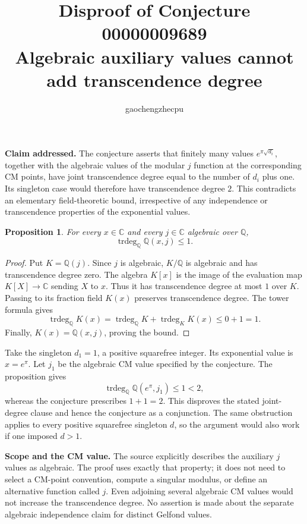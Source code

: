\documentclass[11pt]{article}
\title{Disproof of Conjecture 00000009689\\Algebraic auxiliary values cannot add transcendence degree}
\author{gaochengzhecpu}
\date{}
\newtheorem{proposition}{Proposition}
\begin{document}
\maketitle
\noindent\textbf{Claim addressed.} The conjecture asserts that finitely many values $e^{\pi\sqrt{d_i}}$, together with the algebraic values of the modular $j$ function at the corresponding CM points, have joint transcendence degree equal to the number of $d_i$ plus one. Its singleton case would therefore have transcendence degree $2$. This contradicts an elementary field-theoretic bound, irrespective of any independence or transcendence properties of the exponential values.

\begin{proposition}
For every $x\in\mathbb C$ and every $j\in\mathbb C$ algebraic over $\mathbb Q$,
\[
 \operatorname{trdeg}_{\mathbb Q}\mathbb Q(x,j)\le 1.
\]
\end{proposition}
\begin{proof}
Put $K=\mathbb Q(j)$. Since $j$ is algebraic, $K/\mathbb Q$ is algebraic and has transcendence degree zero. The algebra $K[x]$ is the image of the evaluation map $K[X]\to\mathbb C$ sending $X$ to $x$. Thus it has transcendence degree at most $1$ over $K$. Passing to its fraction field $K(x)$ preserves transcendence degree. The tower formula gives
\[
 \operatorname{trdeg}_{\mathbb Q}K(x)
 =\operatorname{trdeg}_{\mathbb Q}K
   +\operatorname{trdeg}_{K}K(x)\le 0+1=1.
\]
Finally, $K(x)=\mathbb Q(x,j)$, proving the bound.
\end{proof}

Take the singleton $d_1=1$, a positive squarefree integer. Its exponential value is $x=e^\pi$. Let $j_1$ be the algebraic CM value specified by the conjecture. The proposition gives
\[
 \operatorname{trdeg}_{\mathbb Q}\mathbb Q(e^\pi,j_1)\le1<2,
\]
whereas the conjecture prescribes $1+1=2$. This disproves the stated joint-degree clause and hence the conjecture as a conjunction. The same obstruction applies to every positive squarefree singleton $d$, so the argument would also work if one imposed $d>1$.

\noindent\textbf{Scope and the CM value.} The source explicitly describes the auxiliary $j$ values as algebraic. The proof uses exactly that property; it does not need to select a CM-point convention, compute a singular modulus, or define an alternative function called $j$. Even adjoining several algebraic CM values would not increase the transcendence degree. No assertion is made about the separate algebraic independence claim for distinct Gelfond values.
\end{document}
